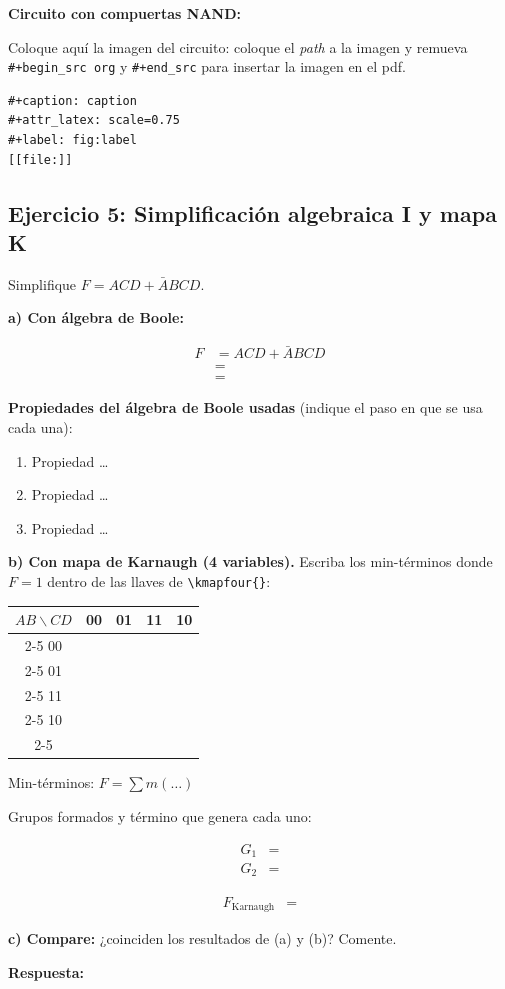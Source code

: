 \documentclass[11pt]{article}
\makeatletter
\newcommand{\kc}[2]{\makebox[1.2cm][c]{\rule[-0.55cm]{0pt}{1.2cm}\in@{,#1,}{,#2,}\ifin@ 1\else 0\fi}}
\newcommand{\kmapfour}[1]{\begin{center}\begin{tabular}{c|*{4}{c|}}\multicolumn{1}{c}{$AB\backslash CD$}&\multicolumn{1}{c}{00}&\multicolumn{1}{c}{01}&\multicolumn{1}{c}{11}&\multicolumn{1}{c}{10}\\\cline{2-5} 00&\kc{0}{#1}&\kc{1}{#1}&\kc{3}{#1}&\kc{2}{#1}\\\cline{2-5} 01&\kc{4}{#1}&\kc{5}{#1}&\kc{7}{#1}&\kc{6}{#1}\\\cline{2-5} 11&\kc{12}{#1}&\kc{13}{#1}&\kc{15}{#1}&\kc{14}{#1}\\\cline{2-5} 10&\kc{8}{#1}&\kc{9}{#1}&\kc{11}{#1}&\kc{10}{#1}\\\cline{2-5}\end{tabular}\end{center}}
\makeatother
\begin{document}
\textbf{Circuito con compuertas NAND:}

Coloque aquí la imagen del circuito: coloque el \emph{path} a la imagen y
remueva \texttt{\#+begin\_src org} y \texttt{\#+end\_src} para insertar la imagen en el pdf. 

\begin{verbatim}
#+caption: caption
#+attr_latex: scale=0.75
#+label: fig:label
[[file:]]
\end{verbatim}

\subsection{Ejercicio 5: Simplificación algebraica I y mapa K}
\label{sec:org3f13f32}
Simplifique \(F = ACD+\bar{A}BCD\).

\textbf{a) Con álgebra de Boole:}

\begin{align*}
  F &= ACD+\bar{A}BCD \\
    &= \\
    &=
\end{align*}

\textbf{Propiedades del álgebra de Boole usadas} (indique el paso en que se usa cada una):
\begin{enumerate}
\item Propiedad \ldots{}
\item Propiedad \ldots{}
\item Propiedad \ldots{}
\end{enumerate}

\textbf{b) Con mapa de Karnaugh (4 variables).} Escriba los min-términos
donde \(F=1\) dentro de las llaves de \texttt{\textbackslash{}kmapfour\{\}}:

\kmapfour{}

Min-términos: \(F=\sum m(\ldots)\)

Grupos formados y término que genera cada uno:

\begin{align*}
  G_1 &= \\
  G_2 &=
\end{align*}

\begin{align*}
  F_{\text{Karnaugh}} &=
\end{align*}

\textbf{c) Compare:} ¿coinciden los resultados de (a) y (b)? Comente.

\textbf{Respuesta:}

\vspace{1.5cm}
\end{document}
